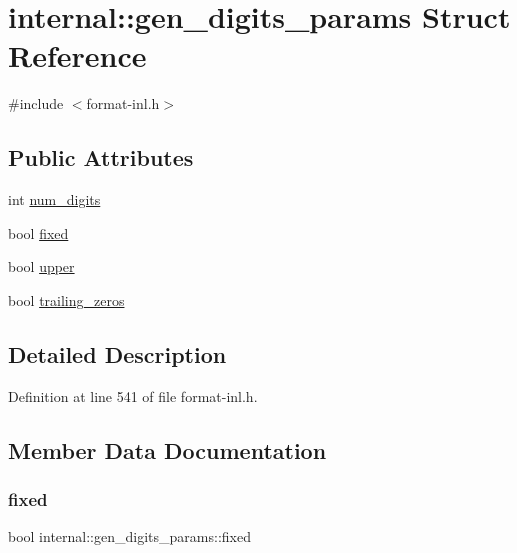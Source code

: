 \hypertarget{structinternal_1_1gen__digits__params}{}\section{internal\+:\+:gen\+\_\+digits\+\_\+params Struct Reference}
\label{structinternal_1_1gen__digits__params}


{\ttfamily \#include $<$format-\/inl.\+h$>$}

\subsection*{Public Attributes}
\begin{DoxyCompactItemize}
\item 
int \hyperlink{structinternal_1_1gen__digits__params_ae41da23da39ec0ec45c1510e3d01e928}{num\+\_\+digits}
\item 
bool \hyperlink{structinternal_1_1gen__digits__params_afb3b1b1f26401004c5d260d466eead10}{fixed}
\item 
bool \hyperlink{structinternal_1_1gen__digits__params_a16bbeb7ea07da0c0a562f0248fe8a600}{upper}
\item 
bool \hyperlink{structinternal_1_1gen__digits__params_aab16ed7c814d239c1ca62222c02045a4}{trailing\+\_\+zeros}
\end{DoxyCompactItemize}


\subsection{Detailed Description}


Definition at line 541 of file format-\/inl.\+h.



\subsection{Member Data Documentation}
\mbox{\label{structinternal_1_1gen__digits__params_afb3b1b1f26401004c5d260d466eead10}} 
\subsubsection{\texorpdfstring{fixed}{fixed}}
{\footnotesize\ttfamily bool internal\+::gen\+\_\+digits\+\_\+params\+::fixed}



